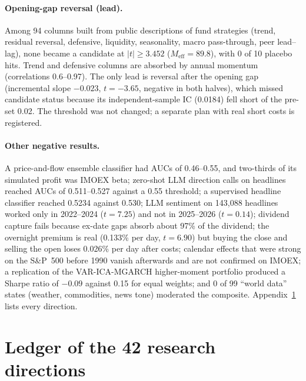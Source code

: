 \paragraph{Opening-gap reversal (lead).} Among 94 columns built from public descriptions of fund strategies (trend, residual reversal, defensive, liquidity, seasonality, macro pass-through, peer lead--lag), none became a candidate at $|t|\ge3.452$ ($M_{\mathrm{eff}}=89.8$), with 0 of 10 placebo hits. Trend and defensive columns are absorbed by annual momentum (correlations 0.6--0.97). The only lead is reversal after the opening gap (incremental slope $-0.023$, $t=-3.65$, negative in both halves), which missed candidate status because its independent-sample IC (0.0184) fell short of the pre-set 0.02. The threshold was not changed; a separate plan with real short costs is registered.

\paragraph{Other negative results.} A price-and-flow ensemble classifier had AUCs of 0.46--0.55, and two-thirds of its simulated profit was IMOEX beta; zero-shot LLM direction calls on headlines reached AUCs of 0.511--0.527 against a 0.55 threshold; a supervised headline classifier reached 0.5234 against 0.530; LLM sentiment on 143,088 headlines worked only in 2022--2024 ($t=7.25$) and not in 2025--2026 ($t=0.14$); dividend capture fails because ex-date gaps absorb about 97\% of the dividend; the overnight premium is real (0.133\% per day, $t=6.90$) but buying the close and selling the open loses 0.026\% per day after costs; calendar effects that were strong on the S\&P~500 before 1990 vanish afterwards and are not confirmed on IMOEX; a replication of the VAR-ICA-MGARCH higher-moment portfolio \citep{mikhaylov2026} produced a Sharpe ratio of $-0.09$ against 0.15 for equal weights; and 0 of 99 ``world data'' states (weather, commodities, news tone) moderated the composite. Appendix~\ref{app:ledger} lists every direction.

\section{Ledger of the 42 research directions}\label{app:ledger}

